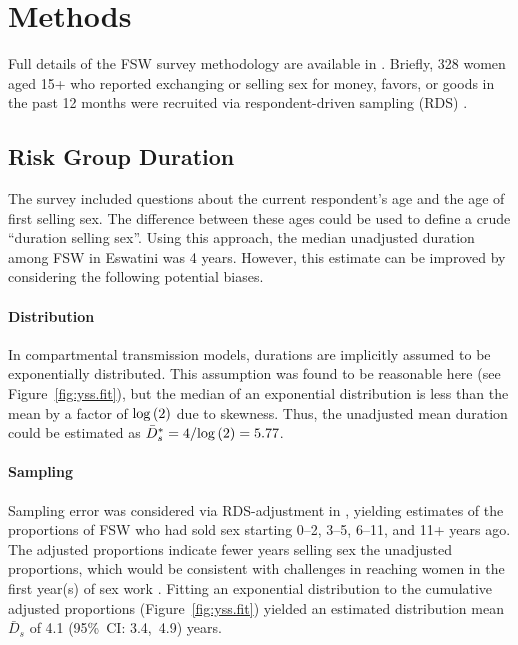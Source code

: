 \section{Methods}\label{meth}
Full details of the FSW survey methodology are available in \cite{Yam2013}.
Briefly, 328 women aged 15+
who reported exchanging or selling sex for money, favors, or goods in the past 12 months
were recruited via respondent-driven sampling (RDS) \cite{Heckathorn1997}.
\clearpage %
\subsection{Risk Group Duration}\label{meth.yss}
The survey included questions about
the current respondent's age and the age of first selling sex.
The difference between these ages could be used to define a crude ``duration selling sex''.
Using this approach, the median unadjusted duration among FSW in Eswatini was 4 years.
However, this estimate can be improved by considering the following potential biases.
\paragraph{Distribution}
In compartmental transmission models,
durations are implicitly assumed to be exponentially distributed.
This assumption was found to be reasonable here (see Figure~\ref{fig:yss.fit}),
but the median of an exponential distribution is less than the mean
by a factor of $\mathrm{log}\,(2)$ due to skewness.
Thus, the unadjusted mean duration could be estimated as $\bar{D}^*_s = 4/\mathrm{log}\,(2) = 5.77$.
\paragraph{Sampling}
Sampling error was considered via RDS-adjustment in \cite{Baral2014},
yielding estimates of the proportions of FSW
who had sold sex starting 0--2, 3--5, 6--11, and 11+ years ago.
The adjusted proportions indicate fewer years selling sex \vs the unadjusted proportions,
which would be consistent with
challenges in reaching women in the first year(s) of sex work \cite{Cheuk2020}.
Fitting an exponential distribution to the cumulative adjusted proportions
(Figure~\ref{fig:yss.fit})
yielded an estimated distribution mean $\bar{D}_s$ of 4.1 (95\%~CI: 3.4,~4.9) years.
